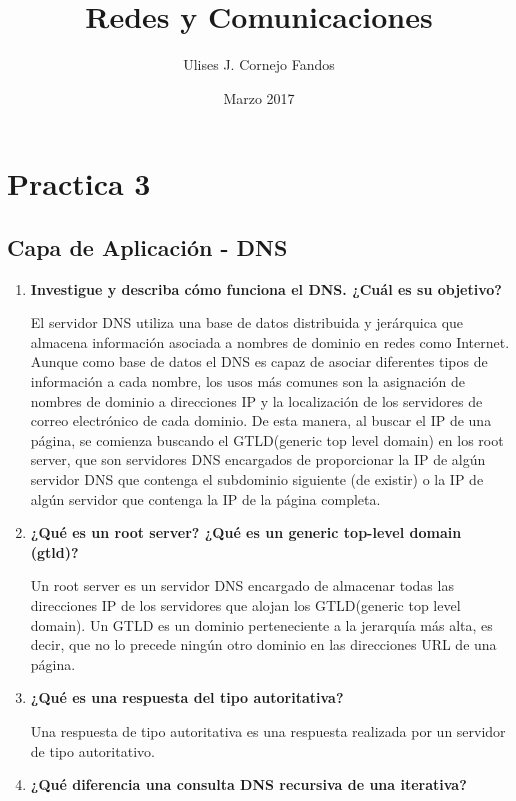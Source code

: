 \documentclass[a4paper,10pt]{article}
\title{Redes y Comunicaciones}
\author{Ulises J. Cornejo Fandos}
\date{Marzo 2017}
\begin{document}
\maketitle

\section{Practica 3}
\subsection{Capa de Aplicación - DNS}
    \begin{enumerate}
        \item  \textbf{Investigue y describa cómo funciona el DNS. ¿Cuál es su objetivo?}
        
        El servidor DNS utiliza una base de datos distribuida y jerárquica que almacena información asociada a nombres de dominio en redes como Internet. Aunque como base de datos el DNS es capaz de asociar diferentes tipos de información a cada nombre, los usos más comunes son la asignación de nombres de dominio a direcciones IP y la localización de los servidores de correo electrónico de cada dominio. De esta manera, al buscar el IP de una página, se comienza buscando el GTLD(generic top level domain) en los root server, que son servidores DNS encargados de proporcionar la IP de algún servidor DNS que contenga el subdominio siguiente (de existir) o la IP de algún servidor que contenga la IP de la página completa.
        
        \item \textbf{¿Qué es un root server? ¿Qué es un generic top-level domain (gtld)?}
        
        Un root server es un servidor DNS encargado de almacenar todas las direcciones IP de los servidores que alojan los GTLD(generic top level domain). Un GTLD es un dominio perteneciente a la jerarquía más alta, es decir, que no lo precede ningún otro dominio en las direcciones URL de una página.
        
        \item \textbf{¿Qué es una respuesta del tipo autoritativa?}
        
        Una respuesta de tipo autoritativa es una respuesta realizada por un servidor de tipo autoritativo.
        
        \item \textbf{¿Qué diferencia una consulta DNS recursiva de una iterativa?}
        

\end{enumerate}
\end{document}
